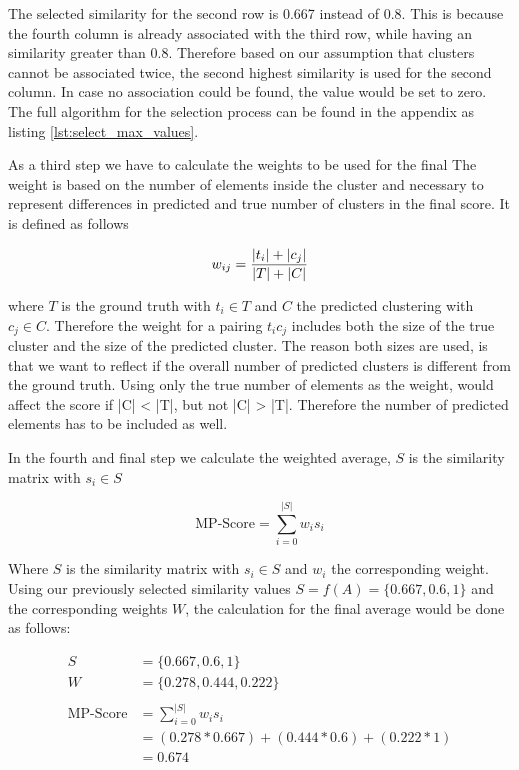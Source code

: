The selected similarity for the second row is 0.667 instead of 0.8. This is because the fourth column is already associated with the third row, while having an similarity greater than 0.8. Therefore based on our assumption that clusters cannot be associated twice, the second highest similarity is used for the second column. In case no association could be found, the value would be set to zero. The full algorithm for the selection process can be found in the appendix as listing \ref{lst:select_max_values}.

As a third step we have to calculate the weights to be used for the final  The weight is based on the number of elements inside the cluster and necessary to represent differences in predicted and true number of clusters in the final score. It is defined as follows

\begin{equation}
    \label{equ:weight}
        w_{ij} = \frac{|t_i| + |c_j|}{|T|+|C|} \\
\end{equation}

where $T$ is the ground truth with $t_i \in T$ and $C$ the predicted clustering with  $c_j \in C$. Therefore the weight for a pairing $t_ic_j$ includes both the size of the true cluster and the size of the predicted cluster. The reason both sizes are used, is that we want to reflect if the overall number of predicted clusters is different from the ground truth. Using only the true number of elements as the weight, would affect the score if |C| < |T|, but not |C| > |T|. Therefore the number of predicted elements has to be included as well.

In the fourth and final step we calculate the weighted average, $S$ is the similarity matrix with $s_{i} \in S$

\begin{equation}
    \label{equ:weighted_average}
        \text{MP-Score} = \sum_{i=0}^{|S|} w_is_i
\end{equation}

Where $S$ is the similarity matrix with $s_{i} \in S$ and $w_i$ the corresponding weight. Using our previously selected similarity values $S = f(A) = \{0.667, 0.6, 1\}$ and the corresponding weights $W$, the calculation for the final average would be done as follows:

\begin{align*}
    S &= \{0.667, 0.6, 1\} \\
    W &= \{0.278, 0.444, 0.222\} \\ \\ 
    \text{MP-Score} &= \sum_{i=0}^{|S|} w_is_i \\ 
    &= (0.278 * 0.667) + (0.444 * 0.6) + (0.222 * 1) \\
    &= \mathbf{0.674}
\end{align*}

